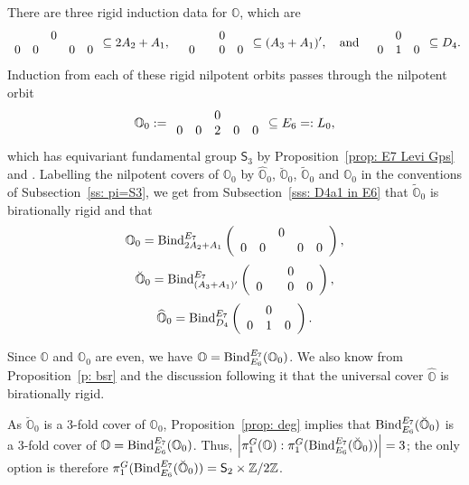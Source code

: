 \documentclass[11pt]{amsart}
\renewcommand{\O}{{\mathbb O}}
\newcommand{\bZ}{{\mathbb Z}}
\newcommand{\Sym}{{\mathsf{S}}}
\newcommand{\BInd}{{{\mbox{\rm Bind}}}}
\newcommand{\covO}{\widetilde{\O}}
\newcommand{\hatO}{\widehat{\O}}
\newcommand{\breveO}{\breve{\O}}
\numberwithin{equation}{section}
\begin{document}
	There are three rigid induction data for $\O$, which are $$\begin{array}{c c c c c}
		& & 0 & & \\
		0 & 0 & & 0 & 0
	\end{array}\subseteq 2A_2+A_1,\quad \begin{array}{c c c c}
		& & 0 & \\
		0 &  & 0 & 0
	\end{array}\subseteq (A_3+A_1)',\quad\mbox{and}\quad \begin{array}{c c c}
		& 0 & \\
		0 & 1 & 0 
	\end{array}\subseteq D_4.$$
	Induction from each of these rigid nilpotent orbits passes through the nilpotent orbit
	$$\O_0:=\begin{array}{c c c c c}
		& & 0 & & \\
		0 & 0 & 2 & 0 & 0
	\end{array}\subseteq E_6=:L_0,$$ which has equivariant fundamental group $\Sym_3$ by Proposition~\ref{prop: E7 Levi Gps} and \cite[\S 8.4]{CM}. Labelling the nilpotent covers of $\O_0$ by $\hatO_0$, $\breveO_0$, $\covO_0$ and $\O_0$ in the conventions of Subsection~\ref{ss: pi=S3}, we get from Subsection~\ref{sss: D4a1 in E6} that $\covO_0$ is birationally rigid and that
	$$\O_0=\BInd_{2 A_2 + A_1}^{E_7}\left(\begin{array}{c c c c c}
		& & 0 & & \\
		0 & 0 &  & 0 & 0 \\
	\end{array}\right),$$
	$$\breveO_0=\BInd_{(A_3 + 
		A_1)'}^{E_7}\left(\begin{array}{c c c c}
		& & 0 & \\
		0 &  & 0 & 0
	\end{array}\right),$$
	$$\hatO_0=\BInd_{D_4}^{E_7}\left(\begin{array}{c c c}
		& 0 & \\
		0 & 1 & 0  \\
	\end{array}\right). $$
	
	Since $\O$ and $\O_0$ are even, we have $\O=\BInd_{E_6}^{E_7}(\O_0)$. We also know from Proposition~\ref{p: bsr} and the discussion following it that the universal cover $\hatO$ is birationally rigid.
	
	As $\breveO_0$ is a 3-fold cover of $\O_0$, Proposition~\ref{prop: deg} implies that $\BInd_{E_6}^{E_7}(\breveO_0)$ is a 3-fold cover of $\O=\BInd_{E_6}^{E_7}(\O_0)$. Thus, $\left\vert \pi_1^G(\O): \pi_1^G(\BInd_{E_6}^{E_7}(\breveO_0)) \right\vert=3$; the only option is therefore $\pi_1^G(\BInd_{E_6}^{E_7}(\breveO_0))=\Sym_2\times\bZ/2\bZ$.
	
\end{document}
